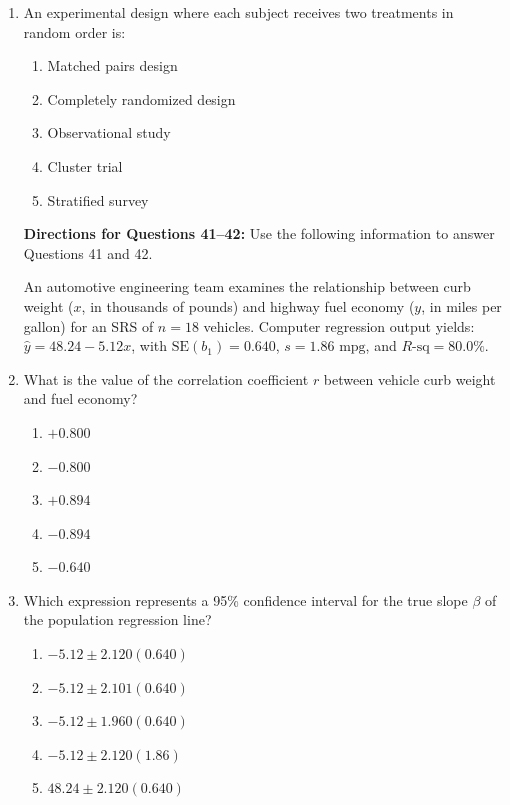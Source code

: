 \begin{enumerate}[resume, leftmargin=1.5em]
  \item An experimental design where each subject receives two treatments in random order is:
  \begin{enumerate}[label=(\Alph*)]
    \item Matched pairs design \item Completely randomized design \item Observational study \item Cluster trial \item Stratified survey
  \end{enumerate}

  \vspace{8pt}
  \noindent\textbf{Directions for Questions 41--42:} Use the following information to answer Questions 41 and 42.

  An automotive engineering team examines the relationship between curb weight ($x$, in thousands of pounds) and highway fuel economy ($y$, in miles per gallon) for an SRS of $n = 18$ vehicles. Computer regression output yields: $\hat{y} = 48.24 - 5.12x$, with $\text{SE}(b_1) = 0.640$, $s = 1.86\text{ mpg}$, and $R\text{-sq} = 80.0\%$.

  \item What is the value of the correlation coefficient $r$ between vehicle curb weight and fuel economy?
  \begin{enumerate}[label=(\Alph*)]
    \item $+0.800$ \item $-0.800$ \item $+0.894$ \item $-0.894$ \item $-0.640$
  \end{enumerate}

  \item Which expression represents a 95\% confidence interval for the true slope $\beta$ of the population regression line?
  \begin{enumerate}[label=(\Alph*)]
    \item $-5.12 \pm 2.120(0.640)$
    \item $-5.12 \pm 2.101(0.640)$
    \item $-5.12 \pm 1.960(0.640)$
    \item $-5.12 \pm 2.120(1.86)$
    \item $48.24 \pm 2.120(0.640)$
  \end{enumerate}
\end{enumerate}

